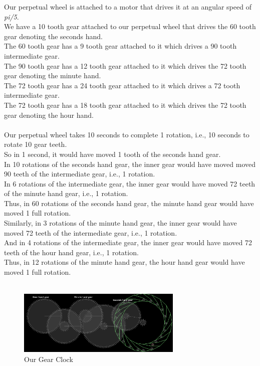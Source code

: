 \documentclass[10pt]{article} \usepackage[a4paper,left=0.8in,right=0.8in,top=0.4in,bottom=0.8in]{geometry} \usepackage{graphicx}
\begin{document}
Our perpetual wheel\cite{wikiper} is attached to a motor that drives it at an angular speed of \textit{pi/5}.\\
We have a 10 tooth gear attached to our perpetual wheel that drives the 60 tooth gear denoting the seconds hand.\\
The 60 tooth gear has a 9 tooth gear attached to it which drives a 90 tooth intermediate gear.\\
The 90 tooth gear has a 12 tooth gear attached to it which drives the 72 tooth gear denoting the minute hand.\\
The 72 tooth gear has a 24 tooth gear attached to it which drives a 72 tooth intermediate gear.\\
The 72 tooth gear has a 18 tooth gear attached to it which drives the 72 tooth gear denoting the hour hand.\\
\\
Our perpetual wheel takes 10 seconds to complete 1 rotation, i.e., 10 seconds to rotate 10 gear teeth.\\
So in 1 second, it would have moved 1 tooth of the seconds hand gear.\\
In 10 rotations of the seconds hand gear, the inner gear would have moved moved 90 teeth of the intermediate gear, i.e., 1 rotation.\\
In 6 rotations of the intermediate gear, the inner gear would have moved 72 teeth of the minute hand gear, i.e., 1 rotation.\\
Thus, in 60 rotations of the seconds hand gear, the minute hand gear would have moved 1 full rotation.\\
Similarly, in 3 rotations of the minute hand gear, the inner gear would have moved 72 teeth of the intermediate gear, i.e., 1 rotation.\\
And in 4 rotations of the intermediate gear, the inner gear would have moved 72 teeth of the hour hand gear, i.e., 1 rotation.\\
Thus, in 12 rotations of the minute hand gear, the hour hand gear would have moved 1 full rotation.\\
\\

\begin{figure}[ht!]
\centering
\includegraphics[width=0.7\textwidth]{images/clock.png}
\caption{Our Gear Clock}
\end{figure}
\end{document}
